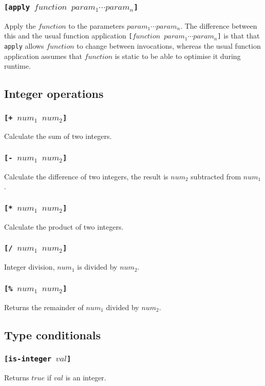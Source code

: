 \subsubsection{\tt{[apply }$function$ $param_1 \cdots param_n$\tt{]}}
Apply the $function$ to the parameters $param_1\cdots param_n$. The difference between this and the usual function application {\tt{[}$function$ $param_1\cdots param_n$\tt{]}} is that that \verb|apply| allows $function$ to change between invocations, whereas the usual function application assumes that $function$ is static to be able to optimise it during runtime.

\subsection{Integer operations}
\subsubsection{\tt{[+ }$num_1$ $num_2$\tt{]}}
Calculate the sum of two integers.
\subsubsection{\tt{[- }$num_1$ $num_2$\tt{]}}
Calculate the difference of two integers, the result is $num_2$ subtracted from $num_1$.
\subsubsection{\tt{[* }$num_1$ $num_2$\tt{]}}
Calculate the product of two integers.
\subsubsection{\tt{[/ }$num_1$ $num_2$\tt{]}}
Integer division, $num_1$ is divided by $num_2$.
\subsubsection{\tt{[\% }$num_1$ $num_2$\tt{]}}
Returns the remainder of $num_1$ divided by $num_2$.

\subsection{Type conditionals}
\subsubsection{\tt{[is-integer }$val$\tt{]}}
Returns $true$ if $val$ is an integer.

